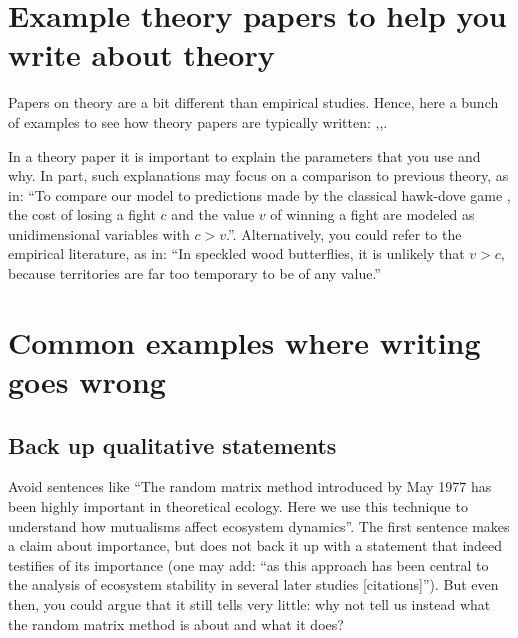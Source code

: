 \documentclass[
]{book}
\begin{document}
\hypertarget{example-theory-papers-to-help-you-write-about-theory}{%
\section{Example theory papers to help you write about theory}\label{example-theory-papers-to-help-you-write-about-theory}}

Papers on theory are a bit different than empirical studies. Hence, here a bunch of examples to see how theory papers are typically written: \citep{Fawcett2007},\citep{Trimmer2015},\citep{Kahn2015}.

In a theory paper it is important to explain the parameters that you use and why. In part, such explanations may focus on a comparison to previous theory, as in: ``To compare our model to predictions made by the classical hawk-dove game \citep{MaynardSmith1973}, the cost of losing a fight \(c\) and the value \(v\) of winning a fight are modeled as unidimensional variables with \(c > v\).''. Alternatively, you could refer to the empirical literature, as in: ``In speckled wood butterflies, it is unlikely that \(v>c\), because territories are far too temporary to be of any value.''

\hypertarget{common-examples-where-writing-goes-wrong}{%
\section{Common examples where writing goes wrong}\label{common-examples-where-writing-goes-wrong}}

\hypertarget{back-up-qualitative-statements}{%
\subsection{Back up qualitative statements}\label{back-up-qualitative-statements}}

Avoid sentences like ``The random matrix method introduced by May 1977 has been highly important in theoretical ecology. Here we use this technique to understand how mutualisms affect ecosystem dynamics''. The first sentence makes a claim about importance, but does not back it up with a statement that indeed testifies of its importance (one may add: ``as this approach has been central to the analysis of ecosystem stability in several later studies {[}citations{]}''). But even then, you could argue that it still tells very little: why not tell us instead what the random matrix method is about and what it does?
\end{document}

